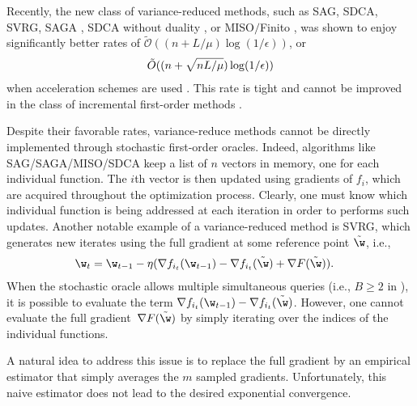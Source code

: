 \documentclass{article}
\theoremstyle{definition}  \newtheorem{exercise}{Exercise}
\theoremstyle{plain}
\newcommand{\pref}[1]{\prettyref{#1}}
\newcommand{\bigtO}[1]{\tilde{\mathcal{O}}{\left(#1\right)}}
\DeclarePairedDelimiter{\prn}{(}{)}
\newcommand{\strcvx}{\mu} \newcommand{\query}{B}
\theoremstyle{definition}
\theoremstyle{remark}
\begin{document}
	
	Recently, the new class of variance-reduced methods, such as SAG, 
	SDCA, SVRG, SAGA \cite{defazio2014saga}, SDCA without duality 
	\cite{shalev2015sdca}, or MISO$\slash$Finito 	
	\cite{mairal2015incremental,defazio2014finito}, 
	was shown to enjoy significantly better rates of 
	$\bigtO{(n+L/\strcvx)\log(1/\epsilon)}$, or
	\begin{align} 
	\label{inc_rates} 
		\tilde{O}\prn{(n+\sqrt{nL/\strcvx})\log(1/\epsilon)} 
	\end{align} 
	when acceleration schemes are used 
	\cite{lin2015universal,shalev2016accelerated,allen2017katyusha}.
	This rate is tight and cannot be improved in the class of 
	incremental first-order methods 
	\cite{woodworth2016tight,arjevani2016dimension}.


	
	Despite their favorable rates, variance-reduce methods cannot be 
	directly implemented 
	through stochastic first-order oracles. Indeed, algorithms like 
	SAG/SAGA/MISO/SDCA keep a list of $n$ vectors in memory, one for each 
	individual function. The $i$th vector is then updated using 
	gradients of $f_i$, which are acquired throughout the optimization 
	process. 
	Clearly, one must know which individual function is being addressed at 
	each iteration in order to performs such updates. Another notable example 
	of a variance-reduced method is  SVRG, which generates new iterates 
	using 
	the full gradient at some reference point $\tilde{\w}$, i.e.,
	\begin{align*}
	\w_t &= \w_{t-1} - \eta \prn{\nabla f_{i_t}(\w_{t-1})  - \nabla 
		f_{i_t}(\tilde{\w}) + \nabla F(\tilde{\w}) }.
	\end{align*}
	When the stochastic oracle allows multiple simultaneous queries (i.e., $\query
	\ge 2$ in \pref{eq:stoch_orc}), it is possible to evaluate the term 
	$\nabla f_{i_t}(\w_{t-1})  - \nabla f_{i_t}(\tilde{\w})$. However, one 
	cannot evaluate the full gradient~$\nabla F(\tilde{\w})$ by simply
	iterating over the indices of the individual functions. 

	A natural idea to address this issue is to replace the full gradient by 
	an empirical estimator that simply averages the $m$ sampled
	gradients. Unfortunately, this naive estimator does not lead to the 
	desired exponential convergence.
	
\end{document}

